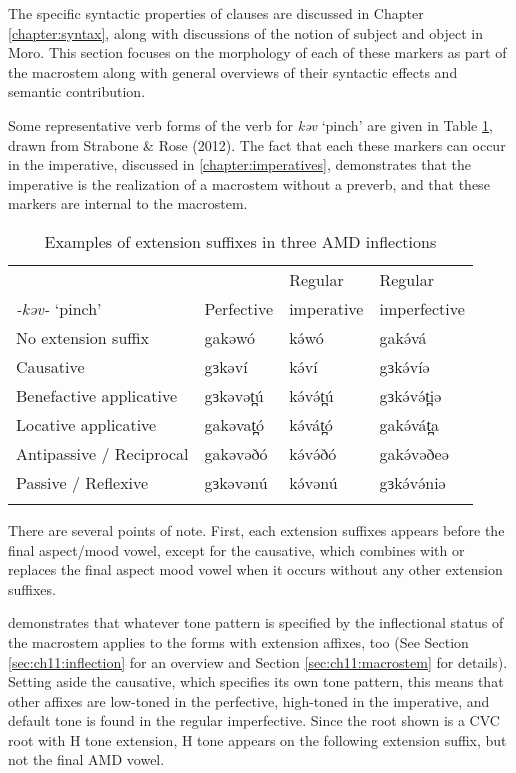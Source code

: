 The specific syntactic properties of clauses are discussed in Chapter \ref{chapter:syntax}, along with discussions of the notion of subject and object in Moro. This section focuses on the morphology of each of these markers as part of the macrostem along with general overviews of their syntactic effects and semantic contribution.

Some representative verb forms of the verb for \textit{kəv} ‘pinch’ are given in Table \ref{tab:ch11:ext1}, drawn from Strabone \& Rose (2012). The fact that each these markers can occur in the imperative, discussed in \ref{chapter:imperatives}, demonstrates that the imperative is the realization of a macrostem without a preverb, and that these markers are internal to the macrostem.

\begin{table}
	\begin{tabular}[t]{llll}
	\lsptoprule
				& 						& {Regular} 	& {Regular} \\
\textit{-kəv-} `pinch'				&		{Perfective}	& {imperative} 	& {imperfective} \\
\midrule 
No extension suffix		&	gakəwó &  kə́wó 			&	 gakə́vá \\
Causative &  gɜkəví &  kə́ví &  gɜkə́víə \\%
Benefactive applicative & gɜkəvət̪ú & kə́və́t̪ú & gɜkə́və́t̪iə\\
Locative applicative & gakəvat̪ó &  kə́vát̪ó & gakə́vát̪a \\
Antipassive / Reciprocal & gakəvəðó &  kə́və́ðó & gakə́vəðeə \\
Passive / Reflexive & gɜkəvənú &  kə́vənú &  gɜkə́və́niə \\
					\lspbottomrule
	\end{tabular}
	\caption{Examples of extension suffixes in three AMD inflections}
	\label{tab:ch11:ext1}
\end{table}
There are several points of note. First, each extension suffixes appears before the final aspect/mood vowel, except for the causative, which combines with or replaces the final aspect mood vowel when it occurs without any other extension suffixes. 

 demonstrates that whatever tone pattern is specified by the inflectional status of the macrostem applies to the forms with extension affixes, too (See Section \ref{sec:ch11:inflection} for an overview and Section \ref{sec:ch11:macrostem} for details). Setting aside the causative, which specifies its own tone pattern, this means that other affixes are low-toned in the perfective, high-toned in the imperative, and default tone is found in the regular imperfective. Since the root shown is a CVC root with H tone extension, H tone appears on the following extension suffix, but not the final AMD vowel.

